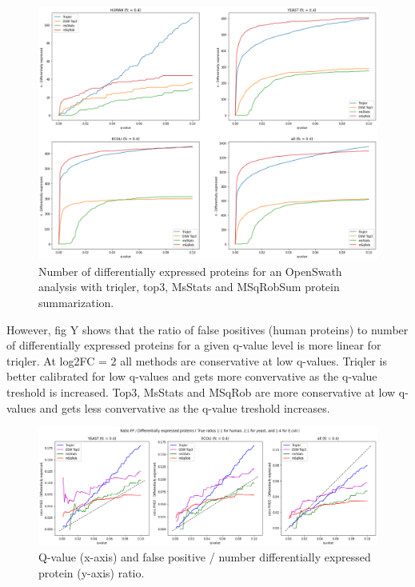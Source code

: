 \documentclass[10pt,letterpaper]{article}
\begin{document}
\begin{figure}[H]
    \centering
    \includegraphics[width=12cm]{../../result/2021-08-13_docs_plots/n_diff_expressed.png}
    \caption{Number of differentially expressed proteins for an OpenSwath analysis with triqler, top3, MsStats and MSqRobSum protein summarization.}
    \label{fig:osw_n_diff_exp}
\end{figure}


However, fig Y shows that the ratio of false positives (human proteins) to number of differentially expressed proteins for a given q-value level is more linear for triqler. At log2FC = 2 all methods are conservative at low q-values. Triqler is better calibrated for low q-values and gets more convervative as the q-value treshold is increased. Top3, MsStats and MSqRob are more conservative at low q-values and gets less convervative as the q-value treshold increases.  

   
\begin{figure}[H]
    \centering
    \includegraphics[width=12cm]{../../result/2021-08-13_docs_plots/calibration_plot.png}
    \caption{Q-value (x-axis) and false positive / number differentially expressed protein (y-axis) ratio.}
    \label{fig:osw_n_diff_exp}
\end{figure}
\end{document}

